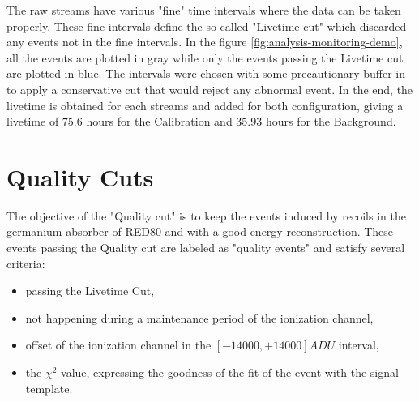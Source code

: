 
The raw streams have various "fine" time intervals where the data can be taken properly. These fine intervals define the so-called "Livetime cut" which discarded any events not in the fine intervals. In the figure \ref{fig:analysis-monitoring-demo}, all the events are plotted in gray while only the events passing the Livetime cut are plotted in blue. The intervals were chosen with some precautionary buffer in to apply a conservative cut that would reject any abnormal event. In the end, the livetime is obtained for each streams and added for both configuration, giving a livetime of $75.6$ hours for the Calibration and $35.93$ hours for the Background.



\section{Quality Cuts}
\label{par:quality-cuts}

The objective of the "Quality cut" is to keep the events induced by recoils in the germanium absorber of RED80 and with a good energy reconstruction. These events  passing the Quality cut are labeled as "quality events" and satisfy several criteria:
\begin{itemize}
	\item passing the Livetime Cut,
	\item not happening during a maintenance period of the ionization channel,
	\item offset of the ionization channel in the $[-14000, +14000] ADU$ interval,
	\item the $\chi^2$ value, expressing the goodness of the fit of the event with the signal template.
\end{itemize}


